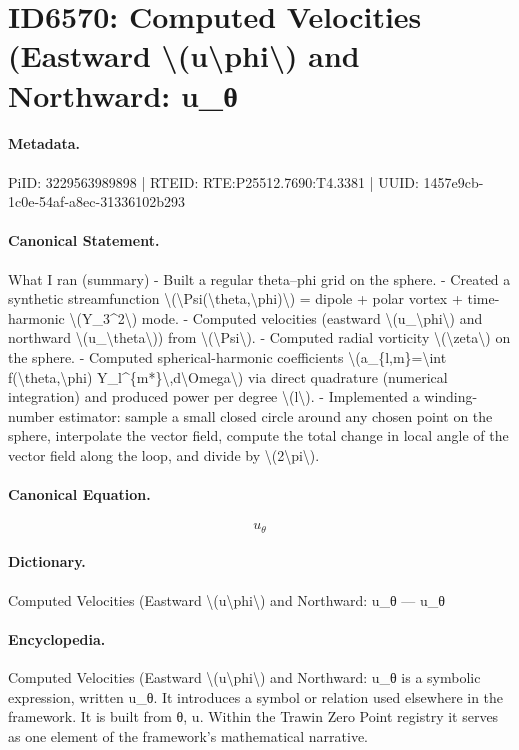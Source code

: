 \section*{ID6570: Computed Velocities (Eastward \textbackslash{}(u\textbackslash{}phi\textbackslash{}) and Northward: u\_θ}
\paragraph{Metadata.}
PiID: 3229563989898 | RTEID: RTE:P25512.7690:T4.3381 | UUID: 1457e9cb-1c0e-54af-a8ec-31336102b293

\paragraph{Canonical Statement.}
What I ran (summary) - Built a regular theta–phi grid on the sphere. - Created a synthetic streamfunction \textbackslash{}(\textbackslash{}Psi(\textbackslash{}theta,\textbackslash{}phi)\textbackslash{}) = dipole + polar vortex + time-harmonic \textbackslash{}(Y\_3\textasciicircum{}2\textbackslash{}) mode. - Computed velocities (eastward \textbackslash{}(u\_\textbackslash{}phi\textbackslash{}) and northward \textbackslash{}(u\_\textbackslash{}theta\textbackslash{})) from \textbackslash{}(\textbackslash{}Psi\textbackslash{}). - Computed radial vorticity \textbackslash{}(\textbackslash{}zeta\textbackslash{}) on the sphere. - Computed spherical-harmonic coefficients \textbackslash{}(a\_\{l,m\}=\textbackslash{}int f(\textbackslash{}theta,\textbackslash{}phi) Y\_l\textasciicircum{}\{m*\}\textbackslash{},d\textbackslash{}Omega\textbackslash{}) via direct quadrature (numerical integration) and produced power per degree \textbackslash{}(l\textbackslash{}). - Implemented a winding-number estimator: sample a small closed circle around any chosen point on the sphere, interpolate the vector field, compute the total change in local angle of the vector field along the loop, and divide by \textbackslash{}(2\textbackslash{}pi\textbackslash{}).

\paragraph{Canonical Equation.}
\[
u_\theta
\]

\paragraph{Dictionary.}
Computed Velocities (Eastward \textbackslash{}(u\textbackslash{}phi\textbackslash{}) and Northward: u\_θ — u\_θ

\paragraph{Encyclopedia.}
Computed Velocities (Eastward \textbackslash{}(u\textbackslash{}phi\textbackslash{}) and Northward: u\_θ is a symbolic expression, written u\_θ. It introduces a symbol or relation used elsewhere in the framework. It is built from θ, u. Within the Trawin Zero Point registry it serves as one element of the framework's mathematical narrative.
